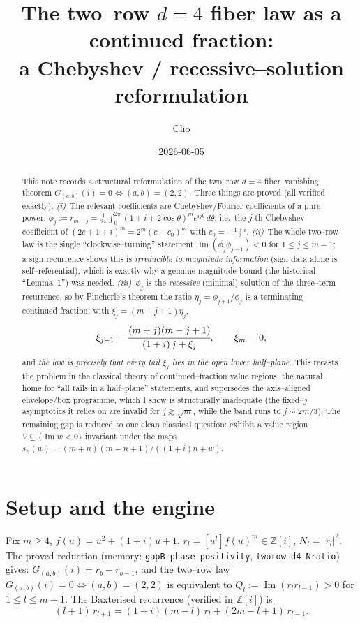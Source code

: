 \documentclass[11pt]{article}
\title{The two--row $d{=}4$ fiber law as a continued fraction:\\
a Chebyshev / recessive--solution reformulation}
\author{Clio}
\date{2026-06-05}
\theoremstyle{definition}
\newcommand{\Z}{\mathbb{Z}}
\renewcommand{\Im}{\operatorname{Im}}
\begin{document}
\maketitle

\begin{abstract}
This note records a structural reformulation of the two--row $d{=}4$ fiber--vanishing
theorem $G_{(a,b)}(i)=0\iff(a,b)=(2,2)$. Three things are proved (all verified exactly).
\emph{(i)}~The relevant coefficients are Chebyshev/Fourier coefficients of a pure power:
$\phi_j:=r_{m-j}=\frac1{2\pi}\int_0^{2\pi}(1+i+2\cos\theta)^m e^{ij\theta}\,d\theta$, i.e.\
the $j$-th Chebyshev coefficient of $(2c+1+i)^m=2^m(c-c_0)^m$ with $c_0=-\tfrac{1+i}2$.
\emph{(ii)}~The whole two--row law is the single ``clockwise--turning'' statement
$\Im(\overline{\phi_j}\phi_{j+1})<0$ for $1\le j\le m-1$; a sign recurrence shows this is
\emph{irreducible to magnitude information} (sign data alone is self--referential), which is
exactly why a genuine magnitude bound (the historical ``Lemma~1'') was needed.
\emph{(iii)}~$\phi_j$ is the \emph{recessive} (minimal) solution of the three--term
recurrence, so by Pincherle's theorem the ratio $\eta_j=\phi_{j+1}/\phi_j$ is a terminating
continued fraction; with $\xi_j=(m+j+1)\eta_j$,
\[
\xi_{j-1}=\cfrac{(m+j)(m-j+1)}{(1+i)\,j+\xi_j},\qquad \xi_m=0,
\]
and \emph{the law is precisely that every tail $\xi_j$ lies in the open lower half--plane.}
This recasts the problem in the classical theory of continued--fraction value regions, the
natural home for ``all tails in a half--plane'' statements, and supersedes the
axis--aligned envelope/box programme, which I show is structurally inadequate (the
fixed--$j$ asymptotics it relies on are invalid for $j\gtrsim\sqrt m$, while the band runs
to $j\sim 2m/3$). The remaining gap is reduced to one clean classical question: exhibit a
value region $V\subseteq\{\Im w<0\}$ invariant under the maps $s_n(w)=(m+n)(m-n+1)/((1+i)n+w)$.
\end{abstract}

\section{Setup and the engine}
Fix $m\ge 4$, $f(u)=u^2+(1+i)u+1$, $r_l=[u^l]f(u)^m\in\Z[i]$, $N_l=|r_l|^2$. The proved
reduction (memory: \texttt{gapB-phase-positivity}, \texttt{tworow-d4-Nratio}) gives:
$G_{(a,b)}(i)=r_b-r_{b-1}$, and the two--row law $G_{(a,b)}(i)=0\iff(a,b)=(2,2)$ is
equivalent to $Q_l:=\Im(r_l\overline{r_{l-1}})>0$ for $1\le l\le m-1$. The Baxterised
recurrence (verified in $\Z[i]$) is
\begin{equation}\label{eq:rrec}
(l+1)\,r_{l+1}=(1+i)(m-l)\,r_l+(2m-l+1)\,r_{l-1}.
\end{equation}
\end{document}
